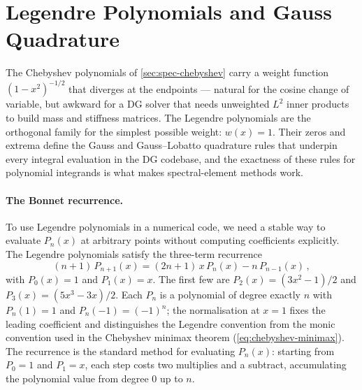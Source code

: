\section{Legendre Polynomials and Gauss Quadrature}
\label{sec:spec-legendre}

The Chebyshev polynomials of \cref{sec:spec-chebyshev} carry a weight
function $(1 - x^2)^{-1/2}$ that diverges at the endpoints --- natural
for the cosine change of variable, but awkward for a DG solver that
needs unweighted $L^2$ inner products to build mass and stiffness
matrices.  The Legendre polynomials are the orthogonal family for the
simplest possible weight: $w(x) = 1$.  Their zeros and extrema define
the Gauss and Gauss--Lobatto quadrature rules that underpin every
integral evaluation in the DG codebase, and the exactness of these
rules for polynomial integrands is what makes spectral-element methods
work.

\paragraph{The Bonnet recurrence.}

To use Legendre polynomials in a numerical code, we need a stable way
to evaluate $P_n(x)$ at arbitrary points without computing
coefficients explicitly.  The Legendre polynomials satisfy the
three-term recurrence
%
\begin{equation}
  (n+1)\,P_{n+1}(x) = (2n+1)\,x\,P_n(x) - n\,P_{n-1}(x) \,,
  \label{eq:legendre-recurrence}
\end{equation}
%
with $P_0(x) = 1$ and $P_1(x) = x$.  The first few are
$P_2(x) = (3x^2 - 1)/2$ and $P_3(x) = (5x^3 - 3x)/2$.  Each $P_n$
is a polynomial of degree exactly $n$ with $P_n(1) = 1$ and
$P_n(-1) = (-1)^n$; the normalisation at $x = 1$ fixes the leading
coefficient and distinguishes the Legendre convention from the monic
convention used in the Chebyshev minimax theorem
(\cref{eq:chebyshev-minimax}).  The recurrence is the standard method
for evaluating $P_n(x)$: starting from $P_0 = 1$ and $P_1 = x$, each
step costs two multiplies and a subtract, accumulating the polynomial
value from degree $0$ up to $n$.

